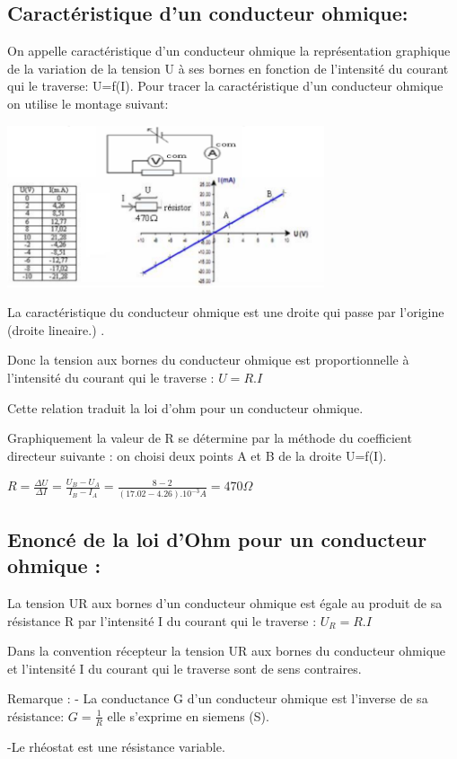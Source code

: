 \documentclass[12pt]{article}
\begin{document}
\subsection{Caractéristique d'un conducteur ohmique: }
On appelle caractéristique d'un conducteur ohmique la représentation graphique de la variation de la
tension U à ses bornes en fonction de l'intensité du courant qui le traverse: U=f(I).
Pour tracer la caractéristique d'un conducteur ohmique on utilise le montage suivant:
\begin{center}
\includegraphics[width=0.7\textwidth]{./img/caracteristique_Resistor.png}
\end{center}

La caractéristique du conducteur ohmique est une droite qui passe par l'origine (droite lineaire.) .

Donc la tension aux bornes du conducteur ohmique est proportionnelle à l'intensité du courant qui le traverse : $U = R.I$

Cette relation traduit la loi d'ohm pour un conducteur ohmique.

Graphiquement la valeur de R se détermine par la méthode du coefficient directeur suivante : on choisi deux points
A et B de la droite U=f(I).

$R = \frac{\Delta{U}}{\Delta{I}} = \frac{U_B - U_A}{I_B - I_A} = \frac{8 - 2}{(17.02 - 4.26).10^{-3}A} = 470\Omega$

\subsection{Enoncé de la loi d'Ohm pour un conducteur ohmique : }

La tension UR aux bornes d'un conducteur ohmique est égale au produit de sa résistance R par l'intensité I
du courant qui le traverse : $U_R = R.I$

Dans la convention récepteur la tension UR aux bornes du conducteur ohmique et l'intensité I du courant qui le
traverse sont de sens contraires.
\begin{tcolorbox}{Remarque : }
 - La conductance G d'un conducteur ohmique est l'inverse de sa résistance: $G=\frac{1}{R}$ 
elle s'exprime en siemens (S). 

-Le rhéostat est une résistance variable.
\end{tcolorbox}
\end{document}
